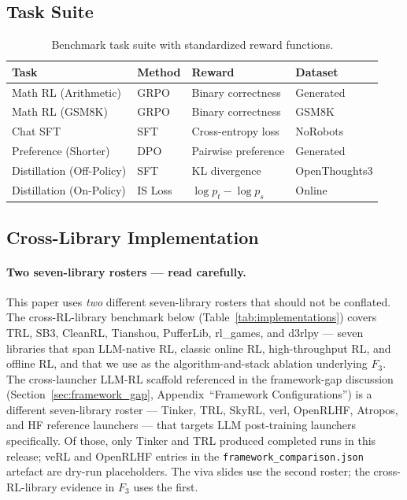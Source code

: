 \documentclass{article}
\begin{document}
\subsection{Task Suite}

\begin{table}[htbp]
\centering
\caption{Benchmark task suite with standardized reward functions.}
\label{tab:tasks}
\begin{tabular}{llll}
\toprule
\textbf{Task} & \textbf{Method} & \textbf{Reward} & \textbf{Dataset} \\
\midrule
Math RL (Arithmetic) & GRPO & Binary correctness & Generated \\
Math RL (GSM8K) & GRPO & Binary correctness & GSM8K \\
Chat SFT & SFT & Cross-entropy loss & NoRobots \\
Preference (Shorter) & DPO & Pairwise preference & Generated \\
Distillation (Off-Policy) & SFT & KL divergence & OpenThoughts3 \\
Distillation (On-Policy) & IS Loss & $\log p_t - \log p_s$ & Online \\
\bottomrule
\end{tabular}
\end{table}

\subsection{Cross-Library Implementation}

\paragraph{Two seven-library rosters --- read carefully.}
This paper uses \emph{two} different seven-library rosters that
should not be conflated. The cross-RL-library benchmark below
(Table~\ref{tab:implementations}) covers TRL, SB3, CleanRL, Tianshou,
PufferLib, rl\_games, and d3rlpy --- seven libraries that span
LLM-native RL, classic online RL, high-throughput RL, and offline RL,
and that we use as the algorithm-and-stack ablation underlying $F_3$.
The cross-launcher LLM-RL scaffold referenced in the framework-gap
discussion (Section~\ref{sec:framework_gap},
Appendix~``Framework Configurations'') is a different seven-library
roster --- Tinker, TRL, SkyRL, verl, OpenRLHF, Atropos, and HF
reference launchers --- that targets LLM post-training launchers
specifically. Of those, only Tinker and TRL produced completed
runs in this release; veRL and OpenRLHF entries in the
\texttt{framework\_comparison.json} artefact are dry-run
placeholders. The viva slides use the second roster; the
cross-RL-library evidence in $F_3$ uses the first.
\end{document}
